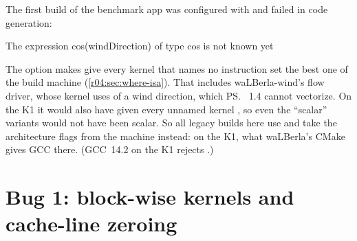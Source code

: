 The first build of the benchmark app was configured with
 and failed in code generation:
\begin{plaincode}
The expression cos(windDirection) of type cos is not known yet
\end{plaincode}
The option makes  give every kernel that names no
instruction set the best one of the build machine (\cref{r04:sec:where-isa}). That
includes waLBerla-wind's flow driver, whose kernel uses  of a wind direction,
which \ps{}~1.4 cannot vectorize. On the K1 it would also have given every unnamed
kernel , so even the ``scalar'' variants would not have been scalar. So all
legacy builds here use  and take the architecture
flags from the machine instead:  on the K1, what waLBerla's
CMake gives GCC there. (GCC~14.2 on the K1 rejects .)

\section{Bug 1: block-wise kernels and cache-line zeroing}\label{r04:sec:blockwise-bug}

